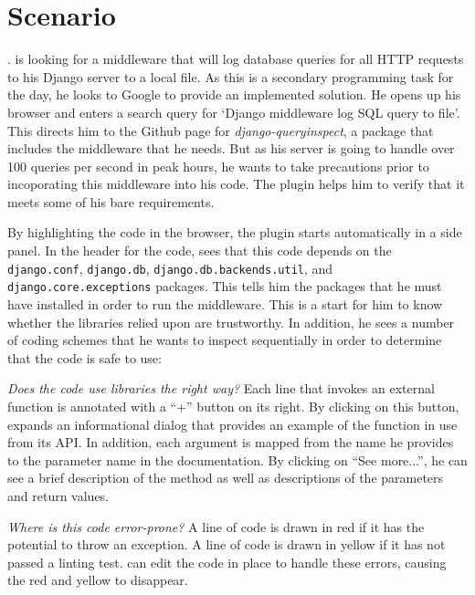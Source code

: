 \section{Scenario}

.
\user{} is looking for a middleware that will log database queries for all HTTP requests to his Django server to a local file.
As this is a secondary programming task for the day, he looks to Google to provide an implemented solution.
He opens up his browser and enters a search query for `Django middleware log SQL query to file'.
This directs him to the Github page for \emph{django-queryinspect}, a package that includes the middleware that he needs.
But as his server is going to handle over 100 queries per second in peak hours, he wants to take precautions prior to incoporating this middleware into his code.
The \systemname{} plugin helps him to verify that it meets some of his bare requirements.

By highlighting the code in the browser, the \systemname{} plugin starts automatically in a side panel.
In the header for the code, \user{} sees that this code depends on the \texttt{django.conf}, \texttt{django.db}, \texttt{django.db.backends.util}, and \texttt{django.core.exceptions} packages.
This tells him the packages that he must have installed in order to run the middleware.
This is a start for him to know whether the libraries relied upon are trustworthy.
In addition, he sees a number of coding schemes that he wants to inspect sequentially in order to determine that the code is safe to use:

\emph{Does the code use libraries the right way?}
Each line that invokes an external function is annotated with a ``+'' button on its right.
By clicking on this button, \user{} expands an informational dialog that provides an example of the function in use from its API.
In addition, each argument is mapped from the name he provides to the parameter name in the documentation.
By clicking on ``See more...'', he can see a brief description of the method as well as descriptions of the parameters and return values.

\emph{Where is this code error-prone?}
A line of code is drawn in red if it has the potential to throw an exception.
A line of code is drawn in yellow if it has not passed a linting test.
\user{} can edit the code in place to handle these errors, causing the red and yellow to disappear.

